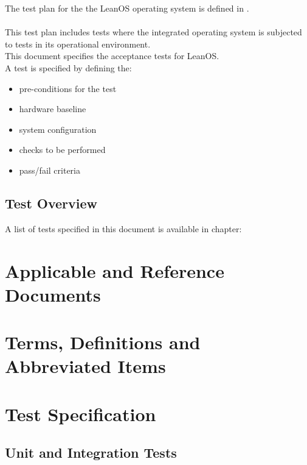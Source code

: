 The test plan for the the LeanOS operating system is defined in
\cite{leanosTP}.\\
\\

\noindent
This test plan includes tests where the integrated operating
system is subjected to tests in its operational environment.\\

\noindent
This document specifies the acceptance tests for LeanOS.\\

\noindent
A test is specified by defining the:
\begin{itemize}
	\item pre-conditions for the test
	\item hardware baseline
	\item system configuration
	\item checks to be performed
	\item pass/fail criteria
\end{itemize}



\section{Test Overview}

A list of tests specified in this document is available in chapter:


\chapter{Applicable and Reference Documents} %

\printbibliography[heading=none]


\chapter{Terms, Definitions and Abbreviated Items}

\printglossary[type=acronym]
\printglossary[type=main, style=altlist]


\chapter{Test Specification}

\section{Unit and Integration Tests}

